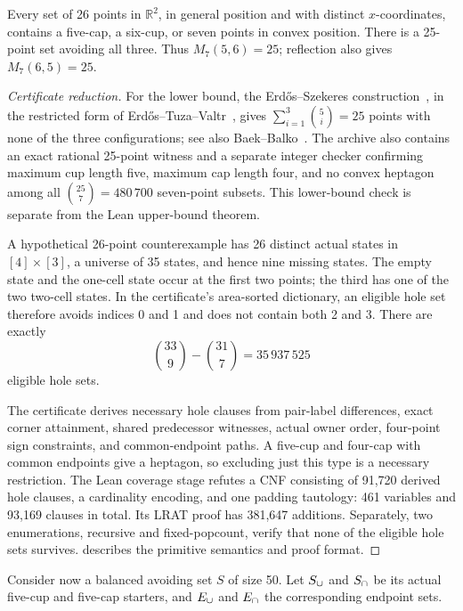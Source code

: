 \begin{theorem}\label{lem:B25}
Every set of 26 points in $\mathbb R^2$, in general position and with
distinct $x$-coordinates, contains a five-cap, a six-cup, or seven
points in convex position. There is a 25-point set avoiding all three.
Thus $M_7(5,6)=25$; reflection also gives $M_7(6,5)=25$.
\end{theorem}
\begin{proof}[Certificate reduction]
For the lower bound, the Erd\H{o}s--Szekeres construction~\cite{ES61},
in the restricted form of Erd\H{o}s--Tuza--Valtr~\cite{ETV}, gives
$\sum_{i=1}^{3}\binom5i=25$ points with none of the three configurations;
see also Baek--Balko~\cite[Section~4]{BB}.
The archive also contains an exact rational 25-point witness and a
separate integer checker confirming maximum cup length five, maximum
cap length four, and no convex heptagon among all
$\binom{25}{7}=480\,700$ seven-point subsets.
This lower-bound check is separate from the Lean upper-bound theorem.

A hypothetical 26-point counterexample has 26 distinct actual states
in $[4]\times[3]$, a universe of 35 states, and hence nine missing
states. The empty state and the one-cell state occur at the first two
points; the third has one of the two two-cell states. In the certificate's
area-sorted dictionary, an eligible hole set therefore avoids indices
0 and 1 and does not contain both 2 and 3. There are exactly
\[
 \binom{33}{9}-\binom{31}{7}=35\,937\,525
\]
eligible hole sets.

The certificate derives necessary hole clauses from pair-label
differences, exact corner attainment, shared predecessor witnesses, actual
owner order, four-point sign constraints, and common-endpoint paths.
A five-cup and four-cap with common endpoints give a heptagon, so
excluding just this type is a necessary restriction. The Lean coverage stage refutes a CNF consisting of 91,720 derived
hole clauses, a cardinality encoding, and one padding tautology:
461 variables and 93,169 clauses in total. Its LRAT proof has
381,647 additions. Separately, two enumerations, recursive and
fixed-popcount, verify that none of the eligible hole sets survives.
 describes the primitive semantics and proof format.
\end{proof}

Consider now a balanced avoiding set $S$ of size 50. Let $S_{\cup}$ and
$S_{\cap}$ be its actual five-cup and five-cap starters, and $E_{\cup}$ and
$E_{\cap}$ the corresponding endpoint sets.

